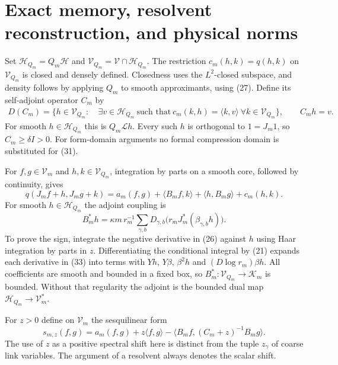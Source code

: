 \documentclass[11pt]{article}
\newcommand{\HH}{\mathscr H}
\newcommand{\KK}{\mathscr K}
\newcommand{\LL}{\mathscr L}
\newcommand{\VV}{\mathscr V}
\begin{document}
\section{Exact memory, resolvent reconstruction, and physical norms}

Set $\HH_{Q_m}=Q_m\HH$ and $\VV_{Q_m}=\VV\cap\HH_{Q_m}$.
The restriction $c_m(h,k)=q(h,k)$ on $\VV_{Q_m}$ is closed and densely
defined. Closedness uses the $L^2$-closed subspace, and density follows
by applying $Q_m$ to smooth approximants, using (27).
Define its self-adjoint operator $C_m$ by
\begin{align}\label{eq:Cdomain}
 D(C_m)=\{h\in\VV_{Q_m}:&\ \exists v\in\HH_{Q_m}\ \text{such that}
 \ c_m(k,h)=\langle k,v\rangle\ \forall k\in\VV_{Q_m}\},
 \qquad C_mh=v.
\end{align}
For smooth $h\in\HH_{Q_m}$ this is $Q_m\LL h$.
Every such $h$ is orthogonal to $1=J_m1$, so $C_m\geq\delta I>0$.
For form-domain arguments no formal compression domain is substituted
for (31).

For $f,g\in\VV_m$ and $h,k\in\VV_{Q_m}$, integration by parts on a
smooth core, followed by continuity, gives
\begin{equation}\label{eq:block}
 q(J_mf+h,J_mg+k)=a_m(f,g)+\langle B_mf,k\rangle
                         +\langle h,B_mg\rangle+c_m(h,k).
\end{equation}
For smooth $h\in\HH_{Q_m}$ the adjoint coupling is
\begin{equation}\label{eq:Bstar}
 B_m^*h=\kappa m\,r_m^{-1}\sum_{\gamma,b}
           D_{\gamma,b}\bigl(r_mJ_m^*(\beta_{\gamma,b}h)\bigr).
\end{equation}
To prove the sign, integrate the negative derivative in (26)
against $h$ using Haar integration by parts in $z$. Differentiating the
conditional integral by (21) expands each derivative
in (33) into terms with $Yh$, $Y\beta$, $\beta^2h$ and
$(D\log r_m)\beta h$. All coefficients are smooth and bounded in a fixed
box, so $B_m^*:\VV_{Q_m}\to\KK_m$ is bounded. Without that regularity
the adjoint is the bounded dual map $\HH_{Q_m}\to\VV_m^*$.

For $z>0$ define on $\VV_m$ the sesquilinear form
\begin{equation}\label{eq:schur}
 s_{m,z}(f,g)=a_m(f,g)+z\langle f,g\rangle
             -\langle B_mf,(C_m+z)^{-1}B_mg\rangle.
\end{equation}
The use of $z$ as a positive spectral shift here is distinct from the
tuple $z_\gamma$ of coarse link variables. The argument of a resolvent
always denotes the scalar shift.
\end{document}
